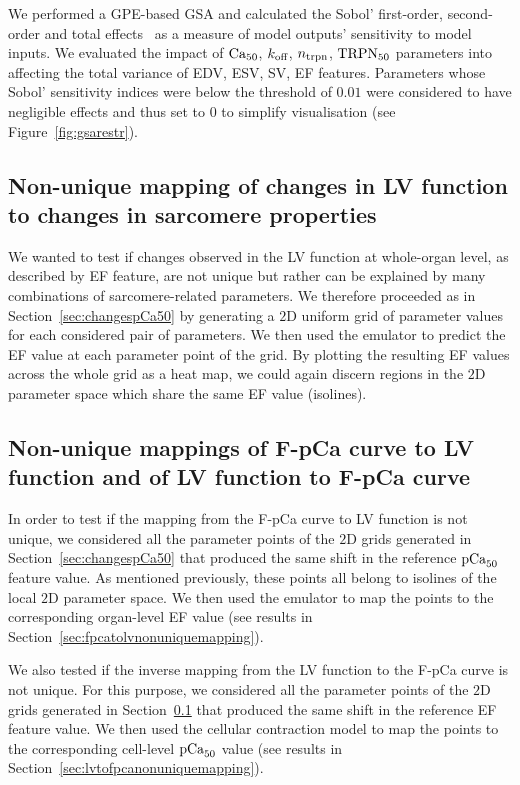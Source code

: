 \vspace{0.2cm}
We performed a GPE-based GSA and calculated the Sobol' first-order, second-order and total effects~\cite{Sobol:2001} as a measure of model outputs' sensitivity to model inputs. We evaluated the impact of $\textrm{Ca}_{50}$, $k_{\textrm{off}}$, $n_{\textrm{trpn}}$, $\textrm{TRPN}_{50}$ parameters into affecting the total variance of EDV, ESV, SV, EF features. Parameters whose Sobol' sensitivity indices were below the threshold of $0.01$ were considered to have negligible effects and thus set to $0$ to simplify visualisation (see Figure~\ref{fig:gsarestr}).


%
%
%
\subsection{Non-unique mapping of changes in LV function to changes in sarcomere properties}\label{sec:changesLVfunction}
We wanted to test if changes observed in the LV function at whole-organ level, as described by EF feature, are not unique but rather can be explained by many combinations of sarcomere-related parameters. We therefore proceeded as in Section~\ref{sec:changespCa50} by generating a $2$D uniform grid of parameter values for each considered pair of parameters. We then used the emulator to predict the EF value at each parameter point of the grid. By plotting the resulting EF values across the whole grid as a heat map, we could again discern regions in the $2$D parameter space which share the same EF value (isolines).


%
%
%
\subsection{Non-unique mappings of F-pCa curve to LV function and of LV function to F-pCa curve}
In order to test if the mapping from the F-pCa curve to LV function is not unique, we considered all the parameter points of the $2$D grids generated in Section~\ref{sec:changespCa50} that produced the same shift in the reference $\textrm{pCa}_{50}$ feature value. As mentioned previously, these points all belong to isolines of the local $2$D parameter space. We then used the emulator to map the points to the corresponding organ-level EF value (see results in Section~\ref{sec:fpcatolvnonuniquemapping}).

\vspace{0.2cm}
We also tested if the inverse mapping from the LV function to the F-pCa curve is not unique. For this purpose, we considered all the parameter points of the $2$D grids generated in Section~\ref{sec:changesLVfunction} that produced the same shift in the reference EF feature value. We then used the cellular contraction model to map the points to the corresponding cell-level $\textrm{pCa}_{50}$ value (see results in Section~\ref{sec:lvtofpcanonuniquemapping}).


